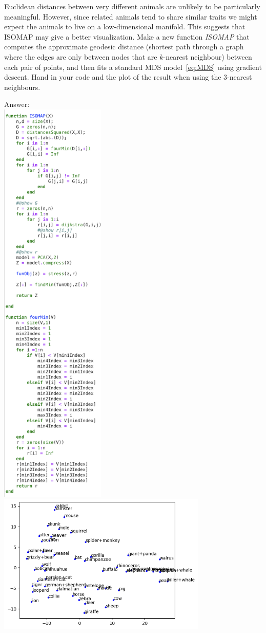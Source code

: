 \documentclass{article}
\def\ans#1{\par\gre{Answer: #1}}
\def\blu#1{{\color{blu}#1}}
\def\gre#1{{\color{gre}#1}}
\begin{document}
Euclidean distances between very different animals are unlikely to be particularly meaningful. However, since related animals tend to share similar traits we might expect the animals to live on a low-dimensional manifold. This suggests that ISOMAP may give a better visualization. Make a new function \emph{ISOMAP} that computes the approximate geodesic distance (shortest path through a graph where the edges are only between nodes that are $k$-nearest neighbour) between each pair of points, and then fits a standard MDS model~\eqref{eq:MDS} using gradient descent. \blu{Hand in your code and the plot of the result when using the $3$-nearest neighbours}.
\ans{\\
\includegraphics[width=5cm]{Q21.png} \\
\includegraphics[width=10cm]{Q21img.png}} \\
\end{document}
